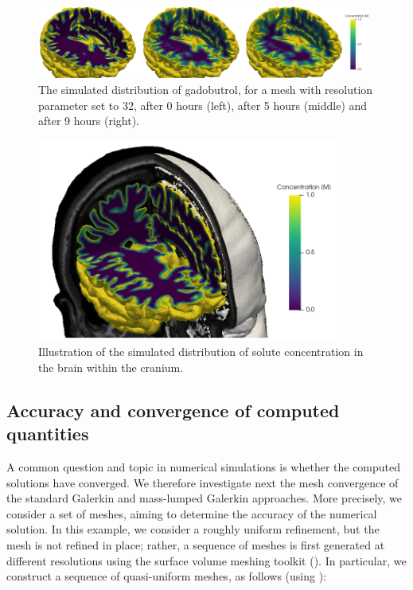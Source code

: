 \begin{figure}	
  \includegraphics[width=0.98\textwidth]{./graphics/chp6/Image1.png}
  \caption{
    The simulated distribution of gadobutrol, for a mesh with resolution parameter set to 32, after 0 hours (left), %
    after 5 hours (middle) and after 9 hours (right).}
  \label{fig:chp6:numerics4}
\end{figure}
\begin{figure}	
  \includegraphics[width=0.90\textwidth]{./graphics/chp6/Image2.png}
  \caption{Illustration of the simulated distribution of solute
    concentration in the brain within the cranium.}
  \label{fig:chp6:numerics5}
\end{figure}



\subsection{Accuracy and convergence of computed quantities} 

A common question and topic in numerical simulations is whether the
computed solutions have converged.  We therefore investigate next the mesh
convergence of the standard Galerkin and mass-lumped Galerkin
approaches. More precisely, we consider a set of meshes, aiming to 
determine the 
%
accuracy of the numerical solution. In this
example, we consider a roughly uniform refinement, but the mesh is not
refined in place; rather, a sequence of meshes is first generated at
different resolutions using the surface volume meshing toolkit (\svmtk). In particular, 
we construct a sequence of quasi-uniform meshes, as follows (using 
):

